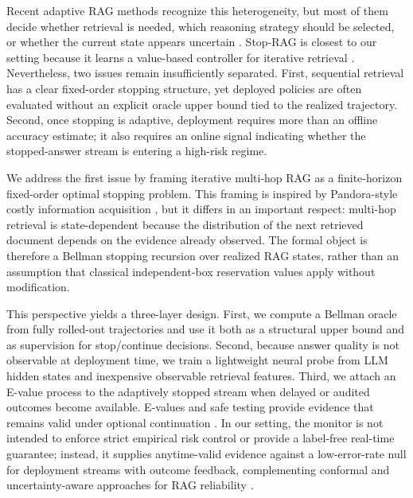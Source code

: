 \documentclass{article}
\begin{document}
Recent adaptive RAG methods recognize this heterogeneity, but most of them decide whether retrieval is needed, which reasoning strategy should be selected, or whether the current state appears uncertain \citep{jeongAdaptiveRAGLearningAdapt2024a,baekProbingRAGSelfProbingGuide2025,yaoSeaKRSelfawareKnowledge2025}. Stop-RAG is closest to our setting because it learns a value-based controller for iterative retrieval \citep{parkStopRAGValueBasedRetrieval2025}. Nevertheless, two issues remain insufficiently separated. First, sequential retrieval has a clear fixed-order stopping structure, yet deployed policies are often evaluated without an explicit oracle upper bound tied to the realized trajectory. Second, once stopping is adaptive, deployment requires more than an offline accuracy estimate; it also requires an online signal indicating whether the stopped-answer stream is entering a high-risk regime.

We address the first issue by framing iterative multi-hop RAG as a finite-horizon fixed-order optimal stopping problem. This framing is inspired by Pandora-style costly information acquisition \citep{weitzmanOptimalSearchBest1979,gergatsouliWeitzmansRulePandoras2023,atsidakouContextualPandorasBox2024}, but it differs in an important respect: multi-hop retrieval is state-dependent because the distribution of the next retrieved document depends on the evidence already observed. The formal object is therefore a Bellman stopping recursion over realized RAG states, rather than an assumption that classical independent-box reservation values apply without modification.

This perspective yields a three-layer design. First, we compute a Bellman oracle from fully rolled-out trajectories and use it both as a structural upper bound and as supervision for stop/continue decisions. Second, because answer quality is not observable at deployment time, we train a lightweight neural probe from LLM hidden states and inexpensive observable retrieval features. Third, we attach an E-value process to the adaptively stopped stream when delayed or audited outcomes become available. E-values and safe testing provide evidence that remains valid under optional continuation \citep{shaferTestingBettingStrategy2021,grunwaldSafeTesting2024}. In our setting, the monitor is not intended to enforce strict empirical risk control or provide a label-free real-time guarantee; instead, it supplies anytime-valid evidence against a low-error-rate null for deployment streams with outcome feedback, complementing conformal and uncertainty-aware approaches for RAG reliability \citep{angelopoulosConformalRiskControl2024,chakrabortyPrincipledContextEngineering2026,fengResponseQualityAssessment2025}.
\end{document}
